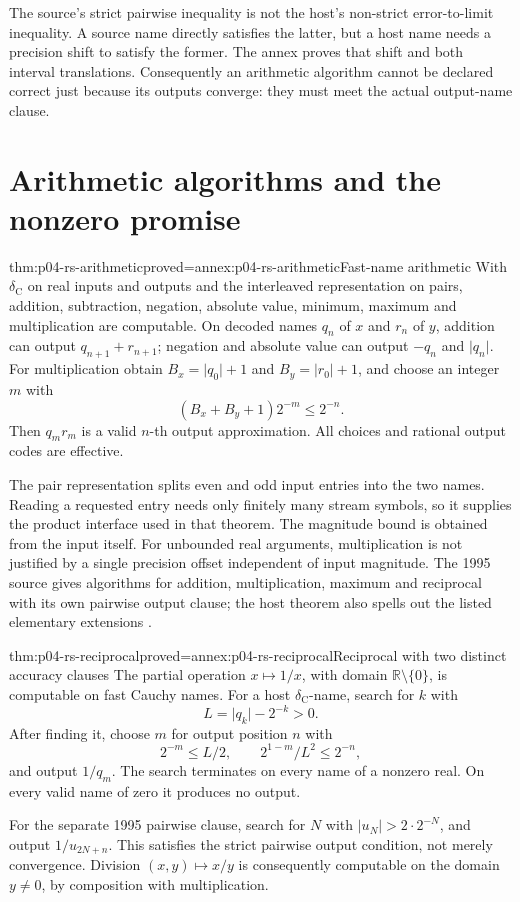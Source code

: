 The source's strict pairwise inequality is not the host's
non-strict error-to-limit inequality. A source name directly
satisfies the latter, but a host name needs a precision shift
to satisfy the former. The annex proves that shift and both
interval translations. Consequently an arithmetic algorithm
cannot be declared correct just because its outputs converge:
they must meet the actual output-name clause.

\section{Arithmetic algorithms and the nonzero promise}
\label{sec:p04-rs-arithmetic}

\begin{hbtheorem}{thm:p04-rs-arithmetic}{proved=annex:p04-rs-arithmetic}{Fast-name arithmetic}
With \(\delta_{\mathrm C}\) on real inputs and outputs and the
interleaved representation on pairs, addition, subtraction,
negation, absolute value, minimum, maximum and multiplication
are computable. On decoded names \(q_n\) of \(x\) and \(r_n\)
of \(y\), addition can output \(q_{n+1}+r_{n+1}\);
negation and absolute value can output \(-q_n\) and
\(\lvert q_n\rvert\).
For multiplication obtain \(B_x=\lvert q_0\rvert+1\) and
\(B_y=\lvert r_0\rvert+1\), and choose an integer \(m\) with
\[
 (B_x+B_y+1)2^{-m}\leq2^{-n}.
\]
Then \(q_mr_m\) is a valid \(n\)-th output approximation.
All choices and rational output codes are effective.
\end{hbtheorem}

The pair representation splits even and odd input entries into
the two names. Reading a requested entry needs only finitely
many stream symbols, so it supplies the product interface used
in that theorem.
The magnitude bound is obtained from the input itself.
For unbounded real arguments, multiplication is not justified
by a single precision offset independent of input magnitude.
The 1995 source gives algorithms for addition, multiplication,
maximum and reciprocal with its own pairwise output clause; the host theorem
also spells out the listed elementary extensions
\cite[Theorem 3.7(1), pp.\ 25--27]{Weihrauch1995IntroductionRS}.

\begin{hbtheorem}{thm:p04-rs-reciprocal}{proved=annex:p04-rs-reciprocal}{Reciprocal with two distinct accuracy clauses}
The partial operation \(x\mapsto1/x\), with domain
\(\mathbb R\setminus\{0\}\), is computable on fast Cauchy names.
For a host \(\delta_{\mathrm C}\)-name, search for \(k\) with
\[
 L=\lvert q_k\rvert-2^{-k}>0.
\]
After finding it, choose \(m\) for output position \(n\) with
\[
 2^{-m}\leq L/2,\qquad
 2^{1-m}/L^2\leq2^{-n},
\]
and output \(1/q_m\).
The search terminates on every name of a nonzero real.
On every valid name of zero it produces no output.

For the separate 1995 pairwise clause, search for \(N\) with
\(\lvert u_N\rvert>2\cdot2^{-N}\), and output
\(1/u_{2N+n}\).
This satisfies the strict pairwise output condition, not merely
convergence. Division \((x,y)\mapsto x/y\) is consequently
computable on the domain \(y\ne0\), by composition with
multiplication.
\end{hbtheorem}

